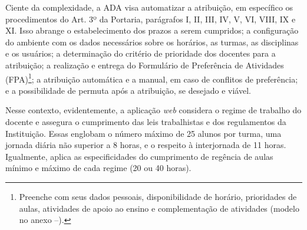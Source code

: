 \documentclass[12pt]{article}
\begin{document}
\par Ciente da complexidade, a ADA visa automatizar a atribuição, em específico os procedimentos do Art. 3º da Portaria, parágrafos I, II, III, IV, V, VI, VIII, IX e XI. Isso abrange o estabelecimento dos prazos a serem cumpridos; a configuração do ambiente com os dados necessários sobre os horários, as turmas, as disciplinas e os usuários; a determinação do critério de prioridade dos docentes para a atribuição; a realização e entrega do Formulário de Preferência de Atividades (FPA)\footnote{Preenche com seus dados pessoais, disponibilidade de horário, prioridades de aulas, atividades de apoio ao ensino e complementação de atividades (modelo no anexo --).}; a atribuição automática e a manual, em caso de conflitos de preferência; e a possibilidade de permuta após a atribuição, se desejado e viável.
\par Nesse contexto, evidentemente, a aplicação \textit{web} considera o regime de trabalho do docente e assegura o cumprimento das leis trabalhistas e dos regulamentos da Instituição. Essas englobam o número máximo de 25 alunos por turma, uma jornada diária não superior a 8 horas, e o respeito à interjornada de 11 horas. Igualmente, aplica as especificidades do cumprimento de regência de aulas mínimo e máximo de cada regime (20 ou 40 horas).
\end{document}
